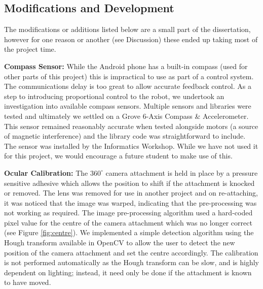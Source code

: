 \documentclass[a4paper,11pt,twoside,openright]{article}
\begin{document}
\subsection{ Modifications and Development }\label{sec:mod}
The modifications or additions listed below are a small part of the dissertation,
however for one reason or another (see Discussion) these ended up taking
most of the project time.\newline\par

\textbf{Compass Sensor:}
While the Android phone has a built-in compass (used for other parts of this
project) this is impractical to use as part of a control system. The
communications delay is too great to allow accurate feedback control.
As a step to introducing proportional control to the robot, we undertook an
investigation into available compass sensors. Multiple sensors and libraries
were tested and ultimately we settled on a Grove 6-Axis Compass \& Accelerometer.
This sensor remained reasonably accurate when tested alongside motors (a
source of magnetic interference) and the library code was straightforward to
include. The sensor was installed by the Informatics Workshop. While we have not
used it for this project, we would encourage a future student to make use of
this.
\newline
\par

\textbf{Ocular Calibration:}
The $360^{\circ}$ camera attachment is held in place by a pressure sensitive
adhesive which allows the position to shift if the attachment is knocked or
removed. The lens was removed for use in another project and on re-attaching, it
was noticed that the image was warped, indicating that the pre-processing was not
working as required. The image pre-processing algorithm used a hard-coded pixel
value for the centre of the camera attachment which was no longer correct
(see Figure \ref{fig:centre}). We implemented a simple detection
algorithm using the Hough transform available in OpenCV to allow the user
to detect the new position of the camera attachment and set the centre
accordingly. The calibration is not performed automatically as the Hough
transform can be slow, and is highly dependent on lighting; instead, it
need only be done if the attachment is known to have moved.
\newline
\par
\end{document}
